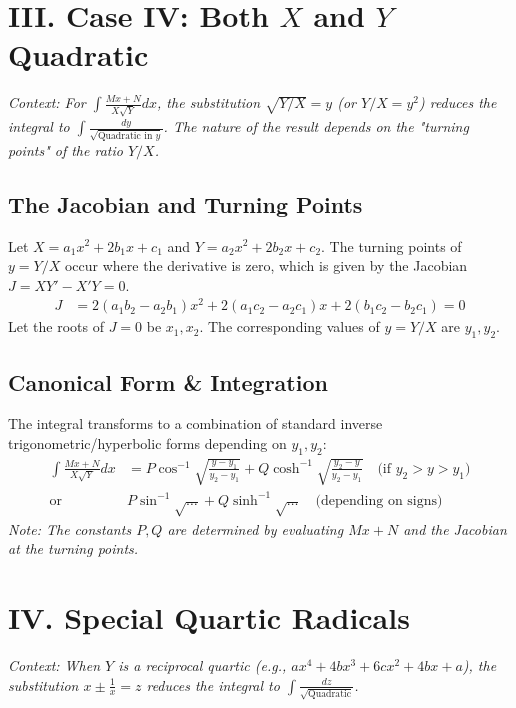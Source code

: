 \documentclass[11pt, a4paper]{article}
\begin{document}
\section*{\color{primary} III. Case IV: Both $X$ and $Y$ Quadratic}

\textit{\small Context: For $\int \frac{Mx+N}{X\sqrt{Y}} dx$, the substitution $\sqrt{Y/X} = y$ (or $Y/X = y^2$) reduces the integral to $\int \frac{dy}{\sqrt{\text{Quadratic in } y}}$. The nature of the result depends on the "turning points" of the ratio $Y/X$.}

\subsection*{\color{secondary} The Jacobian and Turning Points}
Let $X = a_1x^2+2b_1x+c_1$ and $Y = a_2x^2+2b_2x+c_2$. 
The turning points of $y = Y/X$ occur where the derivative is zero, which is given by the Jacobian $J = X Y' - X' Y = 0$.
\begin{align*}
    J &= 2(a_1b_2 - a_2b_1)x^2 + 2(a_1c_2 - a_2c_1)x + 2(b_1c_2 - b_2c_1) = 0
\end{align*}
Let the roots of $J=0$ be $x_1, x_2$. The corresponding values of $y = Y/X$ are $y_1, y_2$.

\subsection*{\color{secondary} Canonical Form \& Integration}
The integral transforms to a combination of standard inverse trigonometric/hyperbolic forms depending on $y_1, y_2$:
\begin{align*}
    \int \frac{Mx+N}{X\sqrt{Y}} dx &= P \cos^{-1}\sqrt{\frac{y-y_1}{y_2-y_1}} + Q \cosh^{-1}\sqrt{\frac{y_2-y}{y_2-y_1}} \quad \text{(if } y_2 > y > y_1 \text{)} \\
    \text{or } & P \sin^{-1}\sqrt{\dots} + Q \sinh^{-1}\sqrt{\dots} \quad \text{(depending on signs)}
\end{align*}
\textit{\small Note: The constants $P, Q$ are determined by evaluating $Mx+N$ and the Jacobian at the turning points.}

\section*{\color{primary} IV. Special Quartic Radicals}

\textit{\small Context: When $Y$ is a reciprocal quartic (e.g., $ax^4+4bx^3+6cx^2+4bx+a$), the substitution $x \pm \frac{1}{x} = z$ reduces the integral to $\int \frac{dz}{\sqrt{\text{Quadratic}}}$.}
\end{document}
